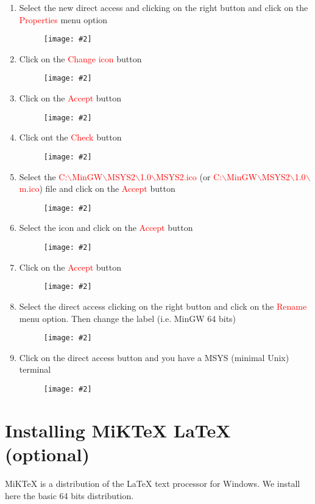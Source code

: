 \documentclass[a4paper]{article}
\newcommand{\FIG}[2]
{
	\begin{figure}[ht!]
	\centering
	\texttt{[image: \#2]}
	\end{figure}
}
\newcommand{\FIGURE}[1]{\FIG{0.35}{#1}}
\newcommand{\RED}[1] {\textcolor{red}{#1}}
\begin{document}
\begin{enumerate}
\clearpage

\item Select the new direct access and clicking on the right button and click on
the \RED{Properties} menu option
\FIGURE{MSYS2-13.png.eps}

\item Click on the \RED{Change icon} button
\FIGURE{MSYS2-14.png.eps}

\clearpage

\item Click on the \RED{Accept} button
\FIGURE{MSYS2-15.png.eps}

\item Click ont the \RED{Check} button
\FIGURE{MSYS2-16.png.eps}

\clearpage

\item Select the
\RED{C:$\backslash$MinGW$\backslash$MSYS2$\backslash$1.0$\backslash$MSYS2.ico} (or
\RED{C:$\backslash$MinGW$\backslash$MSYS2$\backslash$1.0$\backslash$m.ico}) file
and click on the \RED{Accept} button
\FIGURE{MSYS2-17.png.eps}

\item Select the icon and click on the \RED{Accept} button
\FIGURE{MSYS2-18.png.eps}

\clearpage

\item Click on the \RED{Accept} button
\FIGURE{MSYS2-19.png.eps}

\item Select the direct access clicking on the right button and click on the
\RED{Rename} menu option. Then change the label (i.e. MinGW 64 bits)
\FIGURE{MSYS2-20.png.eps}

\clearpage

\item Click on the direct access button and you have a MSYS (minimal Unix)
terminal
\FIGURE{MSYS2-21.png.eps}

\end{enumerate}

\clearpage

\section{Installing MiKTeX LaTeX (optional)}

MiKTeX is a distribution of the LaTeX text processor for Windows. We install
here the basic 64 bits distribution.
\end{document}
